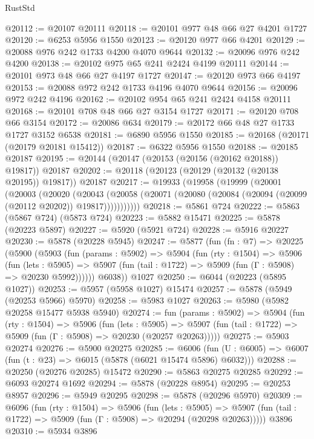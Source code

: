 \begin{lexlean}{RustStd}
\begin{coremodule}
@20112 := @20107 @20111
@20118 := @20101 @977 @48 @66 @27 @4201 @1727
@20120 := @6253 @5956 @1550
@20123 := @20120 @977 @66 @4201
@20129 := @20088 @976 @242 @1733 @4200 @4070 @9644
@20132 := @20096 @976 @242 @4200
@20138 := @20102 @975 @65 @241 @2424 @4199 @20111
@20144 := @20101 @973 @48 @66 @27 @4197 @1727
@20147 := @20120 @973 @66 @4197
@20153 := @20088 @972 @242 @1733 @4196 @4070 @9644
@20156 := @20096 @972 @242 @4196
@20162 := @20102 @954 @65 @241 @2424 @4158 @20111
@20168 := @20101 @708 @48 @66 @27 @3154 @1727
@20171 := @20120 @708 @66 @3154
@20172 := @20086 @634
@20179 := @20172 @66 @48 @27 @1733 @1727 @3152 @6538
@20181 := @6890 @5956 @1550
@20185 := @20168 (@20171 (@20179 @20181 @15412))
@20187 := @6322 @5956 @1550
@20188 := @20185 @20187
@20195 := @20144 (@20147 (@20153 (@20156 (@20162 @20188)) @19817)) @20187
@20202 := @20118 (@20123 (@20129 (@20132 (@20138 @20195)) @19817)) @20187
@20217 := @19933
    (@19958
      (@19999
        (@20001
          (@20003
            (@20020
              (@20043
                (@20058 (@20071 (@20080 (@20084 (@20094 (@20099 (@20112 @20202)) @19817)))))))))))
@20218 := @5861 @724
@20222 := @5863 (@5867 @724) (@5873 @724)
@20223 := @5882 @15471
@20225 := @5878 (@20223 @5897)
@20227 := @5920 (@5921 @724)
@20228 := @5916 @20227
@20230 := @5878 (@20228 @5945)
@20247 := @5877
    (fun (fn : @7) =>
    @20225
      (@5900
        (@5903
          (fun (params : @5902) =>
          @5904
            (fun (rty : @1504) =>
            @5906
              (fun (lets : @5905) =>
              @5907 (fun (tail : @1722) => @5909 (fun (Γ : @5908) => @20230 @5992))))))
        @6038))
    @1027
@20250 := @6044 (@20223 (@5895 @1027))
@20253 := @5957 (@5958 @1027) @15474
@20257 := @5878 (@5949 (@20253 @5966) @5970)
@20258 := @5983 @1027
@20263 := @5980 (@5982 @20258 @15477 @5938 @5940)
@20274 := fun (params : @5902) =>
  @5904
    (fun (rty : @1504) =>
    @5906
      (fun (lets : @5905) =>
      @5907 (fun (tail : @1722) => @5909 (fun (Γ : @5908) => @20230 (@20257 @20263)))))
@20275 := @5903 @20274
@20276 := @5900 @20275
@20285 := @6006
    (fun (U : @6005) => @6007 (fun (t : @23) => @6015 (@5878 (@6021 @15474 @5896) @6032)))
@20288 := @20250 (@20276 @20285) @15472
@20290 := @5863 @20275 @20285
@20292 := @6093 @20274 @1692
@20294 := @5878 (@20228 @8954)
@20295 := @20253 @8957
@20296 := @5949 @20295
@20298 := @5878 (@20296 @5970)
@20309 := @6096
    (fun (rty : @1504) =>
    @5906
      (fun (lets : @5905) =>
      @5907 (fun (tail : @1722) => @5909 (fun (Γ : @5908) => @20294 (@20298 @20263)))))
    @3896
@20310 := @5934 @3896

\end{coremodule}
\end{lexlean}
